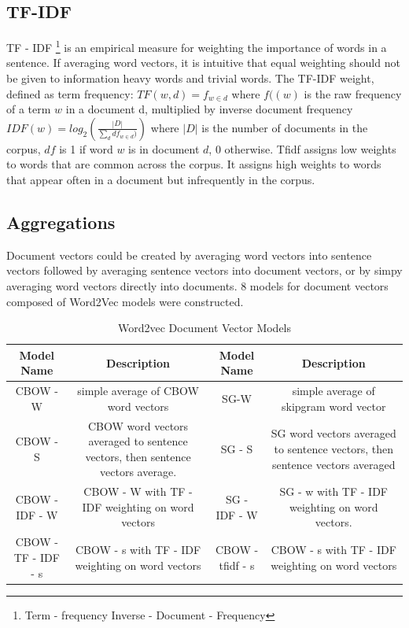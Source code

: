\subsection{TF-IDF}
TF - IDF \footnote{Term - frequency Inverse - Document - Frequency} is an empirical measure for weighting the importance of words in a sentence. If averaging word vectors, it is intuitive that equal weighting should not be given to information heavy words and trivial words. The TF-IDF weight, defined as term frequency: $TF \left( w , d \right) = f_{ w \in d }$ where $f(\left( w \right)$ is the raw frequency of a term $w$ in a document d,
multiplied by inverse document frequency $IDF(w) = log_{2} \left( \frac{|D|}{\sum_d df_{w \in d})} \right)$ where $|D|$ is the number of documents in the corpus, $df$ is 1 if word $w$ is in document $d$, 0 otherwise\cite{gensim}.
Tfidf assigns low weights to words that are common across the corpus. It assigns high weights to words that appear often in a document but infrequently in the corpus.
\subsection{Aggregations}
Document vectors could be created by averaging word vectors into sentence vectors followed by averaging sentence vectors into document vectors, or by simpy averaging word vectors directly into documents. 8 models for document vectors composed of Word2Vec models were constructed.
\begin{table}[h!]
\begin{center}
\label{tab:hyperparams}
\caption{Word2vec Document Vector Models}
\begin{tabular}{||c|c|c|c||}
\hline
Model Name & Description & Model Name & Description\\
\hline
CBOW - W & simple average of CBOW word vectors & SG-W & simple average of skipgram word vector\\
CBOW - S & CBOW word vectors averaged to sentence vectors, then sentence vectors average. & SG - S & SG word vectors averaged to sentence vectors, then sentence vectors averaged\\
CBOW - IDF - W & CBOW - W with TF - IDF weighting on word vectors & SG - IDF - W & SG - w with TF - IDF weighting on word vectors. \\
CBOW - TF - IDF - s & CBOW - s with TF - IDF weighting on word vectors & CBOW - tfidf - s & CBOW - s with TF - IDF weighting on word vectors\\
\hline
\end{tabular}
\end{center}
\end{table}

